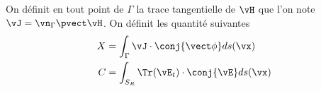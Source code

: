 

  On définit en tout point de \(\Gamma\) la trace tangentielle de \(\vH\) que l'on note \(\vJ = \vn_\Gamma \pvect \vH\). On définit les quantité suivantes
  \begin{align}
    X &= \int_\Gamma \vJ \cdot \conj{\vect \phi} ds(\vx)
    \\
    C &= \int_{S_R} \Tr(\vE_t)  \cdot \conj{\vE} ds(\vx)
  \end{align}








